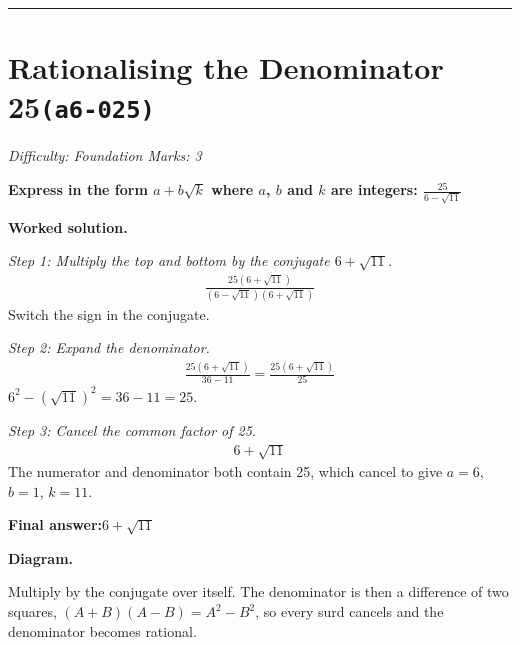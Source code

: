 \documentclass[11pt]{article}
\newcommand{\question}[1]{\par\medskip\noindent\textbf{#1}\par}
\begin{document}
\medskip\hrule

\section*{Rationalising the Denominator 25\quad\small\texttt{(a6-025)}}
\textit{Difficulty: Foundation \quad\textbar\quad Marks: 3}

\question{Express in the form \( a + b\sqrt{k} \) where \( a \), \( b \) and \( k \) are integers: \( \frac{25}{6 - \sqrt{11}} \)}

\textbf{Worked solution.}

\textit{Step 1: Multiply the top and bottom by the conjugate \( 6 + \sqrt{11} \).}
\[\begin{gathered}
\frac{25(6 + \sqrt{11})}{(6 - \sqrt{11})(6 + \sqrt{11})}
\end{gathered}\]
Switch the sign in the conjugate.

\textit{Step 2: Expand the denominator.}
\[\begin{gathered}
\frac{25(6 + \sqrt{11})}{36 - 11} = \frac{25(6 + \sqrt{11})}{25}
\end{gathered}\]
\( 6^2 - (\sqrt{11})^2 = 36 - 11 = 25 \).

\textit{Step 3: Cancel the common factor of 25.}
\[\begin{gathered}
6 + \sqrt{11}
\end{gathered}\]
The numerator and denominator both contain 25, which cancel to give \( a = 6 \), \( b = 1 \), \( k = 11 \).

\begin{answerbox}
\textbf{Final answer:}\quad \(\displaystyle 6 + \sqrt{11}\)
\end{answerbox}
\textbf{Diagram.}

\begin{center}
\end{center}
\small Multiply by the conjugate over itself. The denominator is then a difference of two squares, $(A+B)(A-B)=A^{2}-B^{2}$, so every surd cancels and the denominator becomes rational.\normalsize
\end{document}
